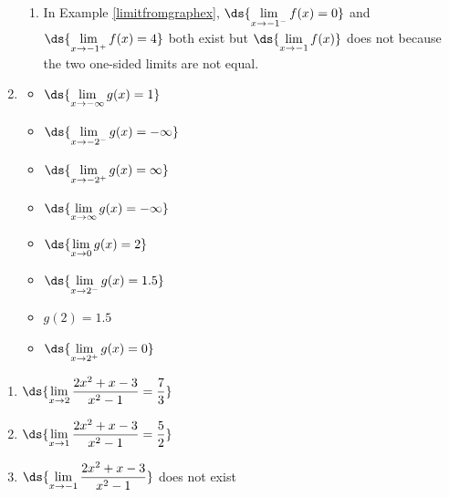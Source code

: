 \documentclass{ximera}
\begin{document}
\begin{enumerate}
\begin{enumerate}
\item  In Example \ref{limitfromgraphex},  $\ds{\lim_{x \rightarrow -1^{-}} f(x)  = 0}$ and $\ds{\lim_{x \rightarrow -1^{+}} f(x) = 4}$ both exist but $\ds{\lim_{x \rightarrow -1} f(x)}$ does not because the two one-sided limits are not equal.

\end{enumerate}

\item  \begin{multicols}{4} \begin{itemize} \item $\ds{\lim_{x \rightarrow -\infty} g(x) = 1}$

\item $\ds{\lim_{x \rightarrow -2^{-}} g(x) = -\infty}$

\item $\ds{\lim_{x \rightarrow -2^{+}} g(x) = \infty}$

\item  $\ds{\lim_{x \rightarrow \infty} g(x) = -\infty}$

\end{itemize}

\end{multicols}

\bigskip

\begin{multicols}{4}

\begin{itemize}

\item $\ds{\lim_{x \rightarrow 0} g(x) = 2}$

\item $\ds{\lim_{x \rightarrow 2^{-}} g(x) = 1.5}$

\item  $g(2) = 1.5$

\item $\ds{\lim_{x \rightarrow 2^{+}} g(x) = 0}$
\end{itemize}

\end{multicols}

\bigskip

\setcounter{HW}{\value{enumi}}
\end{enumerate}
 


\begin{enumerate}
\setcounter{enumi}{\value{HW}}

\item  $\ds{\lim_{x \rightarrow 2} \frac{2x^2+x-3}{x^2-1} = \frac{7}{3}}$

\medskip
  
\item  $\ds{\lim_{x \rightarrow 1} \frac{2x^2+x-3}{x^2-1} = \frac{5}{2}}$

\medskip

\item   $\ds{\lim_{x \rightarrow -1} \frac{2x^2+x-3}{x^2-1}}$ does not exist

\medskip

\setcounter{HW}{\value{enumi}}
\end{enumerate}
\end{document}
